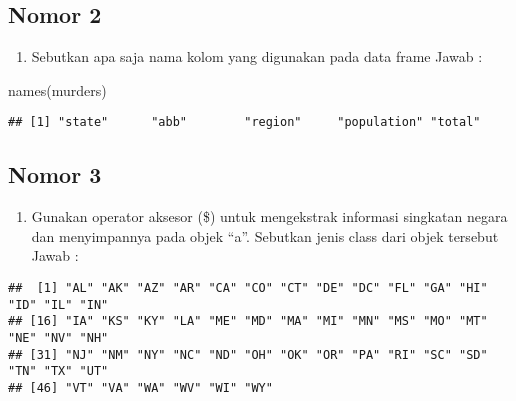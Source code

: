 \documentclass[
]{article}
\newenvironment{Shaded}{\begin{snugshade}}{\end{snugshade}}
\newcommand{\FunctionTok}[1]{\textcolor[rgb]{0.00,0.00,0.00}{#1}}
\newcommand{\NormalTok}[1]{#1}
\newcommand{\OtherTok}[1]{\textcolor[rgb]{0.56,0.35,0.01}{#1}}
\newcommand{\SpecialCharTok}[1]{\textcolor[rgb]{0.00,0.00,0.00}{#1}}
\providecommand{\tightlist}{%
  \setlength{\itemsep}{0pt}\setlength{\parskip}{0pt}}
\begin{document}
\hypertarget{nomor-2}{%
\subsection{Nomor 2}\label{nomor-2}}

\begin{enumerate}
\def\labelenumi{\arabic{enumi}.}
\setcounter{enumi}{1}
\tightlist
\item
  Sebutkan apa saja nama kolom yang digunakan pada data frame Jawab :
\end{enumerate}

\begin{Shaded}
\begin{Highlighting}[]
\FunctionTok{names}\NormalTok{(murders)}
\end{Highlighting}
\end{Shaded}

\begin{verbatim}
## [1] "state"      "abb"        "region"     "population" "total"
\end{verbatim}

\hypertarget{nomor-3}{%
\subsection{Nomor 3}\label{nomor-3}}

\begin{enumerate}
\def\labelenumi{\arabic{enumi}.}
\setcounter{enumi}{2}
\tightlist
\item
  Gunakan operator aksesor (\$) untuk mengekstrak informasi singkatan
  negara dan menyimpannya pada objek ``a''. Sebutkan jenis class dari
  objek tersebut Jawab :
\end{enumerate}

\begin{Shaded}
\end{Shaded}

\begin{verbatim}
##  [1] "AL" "AK" "AZ" "AR" "CA" "CO" "CT" "DE" "DC" "FL" "GA" "HI" "ID" "IL" "IN"
## [16] "IA" "KS" "KY" "LA" "ME" "MD" "MA" "MI" "MN" "MS" "MO" "MT" "NE" "NV" "NH"
## [31] "NJ" "NM" "NY" "NC" "ND" "OH" "OK" "OR" "PA" "RI" "SC" "SD" "TN" "TX" "UT"
## [46] "VT" "VA" "WA" "WV" "WI" "WY"
\end{verbatim}
\end{document}
